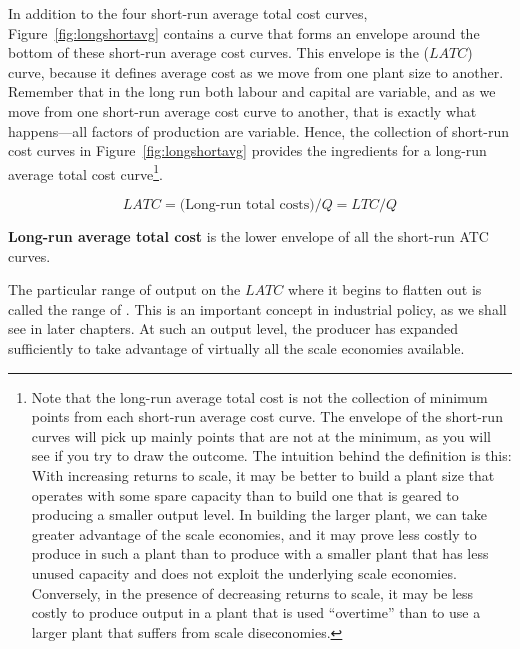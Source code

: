 In addition to the four short-run average total cost curves, Figure~\ref{fig:longshortavg} 
contains a curve that forms an envelope around the bottom
of these short-run average cost curves. This envelope is the 
 ($LATC$) curve, because it defines
average cost as we move from one plant size to another. Remember that in the
long run both labour and capital are variable, and as we move from one
short-run average cost curve to another, that is exactly what happens---all
factors of production are variable. Hence, the collection of short-run cost
curves in Figure~\ref{fig:longshortavg} provides the ingredients for a
long-run average total cost curve\footnote{Note that the long-run average 
total cost is not the collection of minimum	points from each short-run 
average cost curve. The envelope of the short-run curves will pick up 
mainly points that are not at the minimum, as you will see if you try to 
draw the outcome. The intuition behind the definition is this: With increasing 
returns to scale, it may be better to build a plant	size that operates 
with some spare capacity than to build one that is geared to producing 
a smaller output level. In building the larger plant, we can take greater 
advantage of the scale economies, and it may prove less costly to produce 
in such a plant than to produce with a smaller plant that has less unused 
capacity and does not exploit the underlying scale economies. Conversely, 
in the presence of decreasing returns to scale, it may be less costly to 
produce output in a plant that is used ``overtime'' than to use a larger 
plant that suffers from	scale diseconomies.}.

\newhtmlpage



\begin{equation*}
	LATC=\text{(Long-run total costs)}/Q=LTC/Q
\end{equation*}

\begin{DefBox}
	\textbf{Long-run average total cost} is the lower envelope of all the short-run ATC curves.
\end{DefBox}

The particular range of output on the $LATC$ where it begins to flatten out is
called the range of . This is an
important concept in industrial policy, as we shall see in later chapters.
At such an output level, the producer has expanded sufficiently to take
advantage of virtually all the scale economies available.

